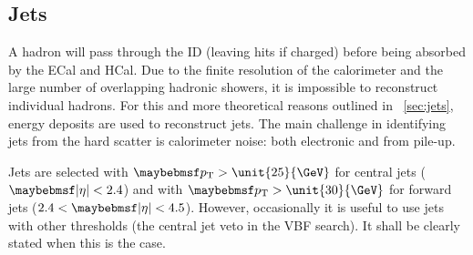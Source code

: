 \subsection{Jets}
\label{sec:objects:jets}

A hadron will pass through the \ac{ID} (leaving hits if charged) before being absorbed by 
the \ac{ECal} and \ac{HCal}. Due to the finite resolution of the calorimeter and the 
large number of overlapping hadronic showers, it is impossible to reconstruct individual 
hadrons. For this and more theoretical reasons outlined in \Section~\ref{sec:jets}, 
energy deposits are used to reconstruct jets. The main challenge in identifying jets from 
the hard scatter is calorimeter noise: both electronic and from pile-up.

Jets are selected with $\pt > \unit{25}{\GeV}$ for central jets ($\mods{\eta} < 2.4$) and 
with $\pt > \unit{30}{\GeV}$ for forward jets ($2.4 < \mods{\eta} < 4.5$). However, 
occasionally it is useful to use jets with other \pt thresholds (\eg the central jet 
veto in the VBF search). It shall be clearly stated when this is the case.

